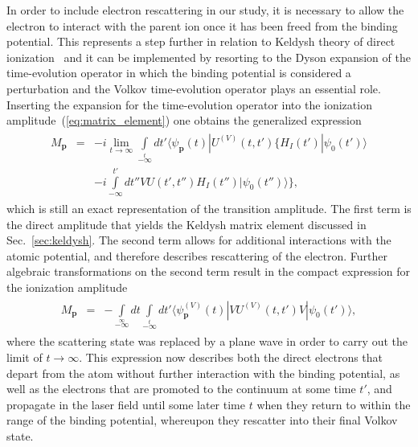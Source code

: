 In order to include electron rescattering in our study, it is
necessary to allow the electron to interact with the parent ion once
it has been freed from the binding potential. This represents a step
further in relation to Keldysh theory of direct
ionization~\cite{KeldyshSFA} and it can be implemented by resorting to
the Dyson expansion of the time-evolution operator in which the
binding potential is considered a perturbation and the Volkov
time-evolution operator plays an essential role. Inserting the
expansion for the time-evolution operator into the ionization
amplitude~(\ref{eq:matrix_element}) one obtains the generalized
expression~\cite{Kopold_1997sfa}
%
\begin{eqnarray}
\label{eq:mp_2terms}
\begin{split}
M_{\mathbf{p}} & = & -i \lim\limits_{t\to\infty} \int\limits_{-\infty}\limits^{t}
dt' \langle \psi_{\mathbf{p}}(t) | U^{(V)}(t, t') \{ H_{I}(t') | \psi_{0}(t') \rangle \\
& &
-i \int\limits_{-\infty}^{t'} dt'' V U(t', t'') H_{I}(t'') | \psi_{0}(t'') \rangle \},
\end{split}
\end{eqnarray}
%
which is still an exact representation of the transition
amplitude. The first term is the direct amplitude that yields the
Keldysh matrix element discussed in Sec.~\ref{sec:keldysh}. The second
term allows for additional interactions with the atomic potential, and
therefore describes rescattering of the electron. Further algebraic
transformations on the second term result in the compact expression
for the ionization amplitude~\cite{Kopold_1997sfa}
%
\begin{eqnarray}
\label{eq:mp_compact}
\begin{split}
M_{\mathbf{p}} & = & - \int\limits_{-\infty}\limits^{\infty} dt
\int\limits_{-\infty}\limits^{t} dt' \langle \psi_{\mathbf{p}}^{(V)}(t)
| V U^{(V)}(t, t') V | \psi_{0}(t') \rangle,
\end{split}
\end{eqnarray}
%
where the scattering state was replaced by a plane wave in order to
carry out the limit of $t\to\infty$. This expression now describes
both the direct electrons that depart from the atom without further
interaction with the binding potential, as well as the electrons that
are promoted to the continuum at some time $t'$, and propagate in the
laser field until some later time $t$ when they return to within the
range of the binding potential, whereupon they rescatter into their
final Volkov state.

